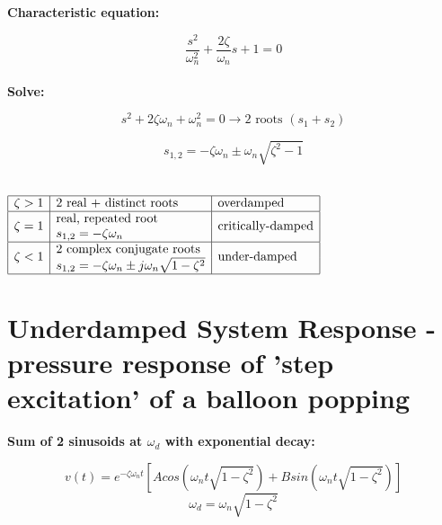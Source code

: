 {\bf Characteristic equation:}

\begin{equation} \dfrac{s^2}{\omega_n^2} + \dfrac{2\zeta}{\omega_n}s + 1 = 0 \end{equation} \\

{\bf Solve:}

\begin{equation} s^2 + 2\zeta \omega_n + \omega_n^2 = 0 \longrightarrow 2 \text{ roots } (s_1 + s_2) \end{equation}

\begin{equation} s_{1,2} = -\zeta \omega_n \pm \omega_n \sqrt{\zeta^2 - 1} \end{equation} \\

\begin{center}
$\begin{array}{|l|l|l|} 
\hline
\zeta > 1 & 2 \text{ real + distinct roots} &  \text{overdamped} \\ \hline
\multirow{2}{*}{$\zeta = 1$} & \text{real, repeated root} & \multirow{2}{*}{critically-damped} \\ 
& s_{1,2} = -\zeta \omega_n & \\ \hline
\multirow{2}{*}{$\zeta < 1$} & 2 \text{ complex conjugate roots} &  \multirow{2}{*}{under-damped}\\
& s_{1,2} = -\zeta \omega_n \pm j \omega_n \sqrt{1 - \zeta^2} &  \\ \hline


\end{array}$
\end{center}

\pagebreak

\section*{Underdamped System Response - pressure response of 'step
excitation' of a balloon popping}

{\bf Sum of 2 sinusoids at $\omega_d$ with exponential decay: }

\begin{equation} v(t) = e^{-\zeta \omega_n t} \left[ Acos\left(\omega_n t \sqrt{1 - \zeta^2} \right) + B sin \left( \omega_n t \sqrt{1 - \zeta^2} \right) \right] \end{equation}
\begin{equation} \omega_d = \omega_n \sqrt{1 - \zeta^2} \end{equation}

